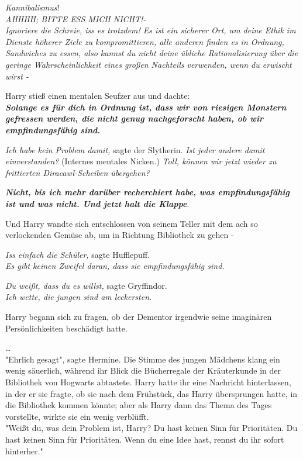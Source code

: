 {\emph{Kannibalismus}!\\ \emph{AHHHH; BITTE ESS MICH NICHT!-}\\ \emph{Ignoriere die Schreie, iss es trotzdem! Es ist ein sicherer Ort, um deine Ethik im Dienste höherer Ziele zu kompromittieren, alle anderen finden es in Ordnung, Sandwiches zu essen, also kannst du nicht deine übliche Rationalisierung über die geringe Wahrscheinlichkeit eines großen Nachteils verwenden, wenn du erwischt wirst -}

Harry stieß einen mentalen Seufzer aus und dachte:\\ \textbf{\emph{Solange es für dich in Ordnung ist, dass wir von riesigen Monstern gefressen werden, die nicht genug nachgeforscht haben, ob wir empfindungsfähig sind.}}

\emph{Ich habe kein Problem damit,} sagte der Slytherin. \emph{Ist jeder andere damit einverstanden?} (Internes mentales Nicken.) \emph{Toll, können wir jetzt wieder zu frittierten Diracawl-Scheiben übergehen?}

\textbf{\emph{Nicht, bis ich mehr darüber recherchiert habe, was empfindungsfähig ist und was nicht. Und jetzt halt die Klappe}}.

Und Harry wandte sich entschlossen von seinem Teller mit dem ach so verlockenden Gemüse ab, um in Richtung Bibliothek zu gehen -

\emph{Iss einfach die Schüler,} sagte Hufflepuff.\\ \emph{Es gibt keinen Zweifel daran, dass sie empfindungsfähig sind.}

\emph{Du weißt, dass du es willst,} sagte Gryffindor.\\ \emph{Ich wette, die jungen sind am leckersten.}

Harry begann sich zu fragen, ob der Dementor irgendwie seine imaginären Persönlichkeiten beschädigt hatte.

…\\ "Ehrlich gesagt", sagte Hermine. Die Stimme des jungen Mädchens klang ein wenig säuerlich, während ihr Blick die Bücherregale der Kräuterkunde in der Bibliothek von Hogwarts abtastete. Harry hatte ihr eine Nachricht hinterlassen, in der er sie fragte, ob sie nach dem Frühstück, das Harry übersprungen hatte, in die Bibliothek kommen könnte; aber als Harry dann das Thema des Tages vorstellte, wirkte sie ein wenig verblüfft.\\ "Weißt du, was dein Problem ist, Harry? Du hast keinen Sinn für Prioritäten. Du hast keinen Sinn für Prioritäten. Wenn du eine Idee hast, rennst du ihr sofort hinterher."

}
